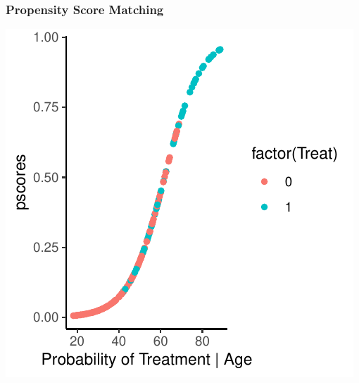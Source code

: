 \documentclass[xcolor=x11names,compress]{beamer}\usepackage[]{graphicx}\usepackage[]{color}
\makeatletter
\def\maxwidth{ %
  \ifdim\Gin@nat@width>\linewidth
    \linewidth
  \else
    \Gin@nat@width
  \fi
}
\newenvironment{knitrout}{}{} %
\renewcommand{\(}{\begin{columns}}
\renewcommand{\)}{\end{columns}}
\newcommand{\<}[1]{\begin{column}{#1}}
\renewcommand{\>}{\end{column}}
\makeatother
\begin{document}
\begin{frame}
\frametitle{Propensity Score Matching}
\begin{center}
\begin{knitrout}
\color{fgcolor}
\includegraphics[width=\maxwidth]{figure/pscore_matching_3-1} 

\end{knitrout}
\end{center}
\end{frame}
\end{document}
